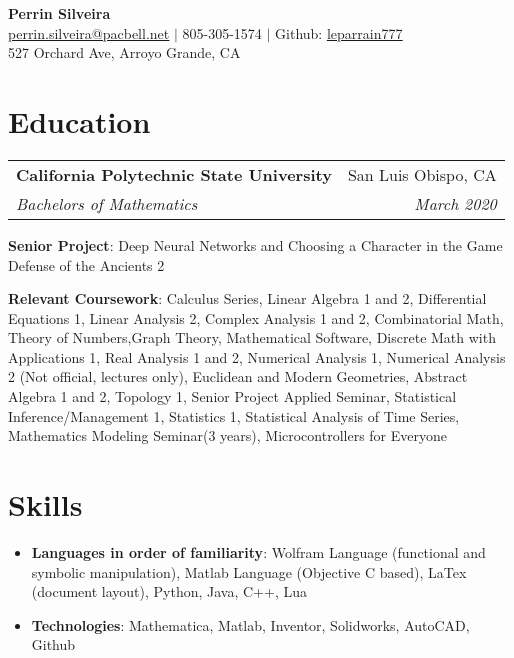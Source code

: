 \documentclass[letterpaper,10pt]{article}
\makeatletter
\newcommand{\resumeItemNoBullet}[2]{
  \item[]\small{
    \hspace{-9pt}\textbf{#1}{: #2 \vspace{-6pt}}
  }
}
\newcommand{\resumeSubheading}[4]{
  \vspace{-1pt}\item[]
  \begin{tabular*}{0.98\textwidth}{l@{\extracolsep{\fill}}r}
      \hspace{-10pt}\textbf{#1} & #2 \\
      \hspace{-10pt}\textit{\small#3} & \textit{\small #4} \\
    \end{tabular*}\vspace{-5pt}
}
\newcommand{\resumeSubHeadingListStart}{\begin{itemize}[leftmargin=*]}
\newcommand{\resumeSubHeadingListEnd}{\end{itemize}}
\newcommand{\shorterSection}[1]{\vspace{-10pt}\section{#1}}
\makeatother
\begin{document}
\begin{center}
  \small \textbf{{\huge Perrin Silveira}} \\  \href{mailto:perrin.silveira@pacbell.net}{\color{blue}\underline{perrin.silveira@pacbell.net}} $\vert$
  805-305-1574 $\vert$
  Github: \href{https://github.com/leparrain777}{\color{blue}\underline{leparrain777}} \\
  \small 527 Orchard Ave, Arroyo Grande, CA
\end{center}

\shorterSection{Education}
  \resumeSubHeadingListStart
    \resumeSubheading
      {California Polytechnic State University}{San Luis Obispo, CA}
      {Bachelors of Mathematics}{March 2020}{
      \resumeItemNoBullet{Senior Project}{Deep Neural Networks and Choosing a Character in the Game Defense of the Ancients 2}
      \resumeItemNoBullet{Relevant Coursework}{Calculus Series, Linear Algebra 1 and 2, Differential Equations 1, Linear Analysis 2, Complex Analysis 1 and 2, Combinatorial Math, Theory of Numbers,Graph Theory, Mathematical Software, Discrete Math with Applications 1, Real Analysis 1 and 2, Numerical Analysis 1, Numerical Analysis 2 (Not official, lectures only), Euclidean and Modern Geometries, Abstract Algebra 1 and 2, Topology 1, Senior Project Applied Seminar, Statistical Inference/Management 1, Statistics 1, Statistical Analysis of Time Series, Mathematics Modeling Seminar(3 years), Microcontrollers for Everyone}
    }
  \resumeSubHeadingListEnd

\shorterSection{Skills}
  \resumeSubHeadingListStart
  \small
    \item{
     \textbf{Languages in order of familiarity}{: Wolfram Language (functional and symbolic manipulation),  Matlab Language (Objective C based), LaTex (document layout), Python, Java, C++, Lua }}
     \item{
     \textbf{Technologies}{: Mathematica, Matlab, Inventor, Solidworks, AutoCAD, Github}
    }
\resumeSubHeadingListEnd
\end{document}
